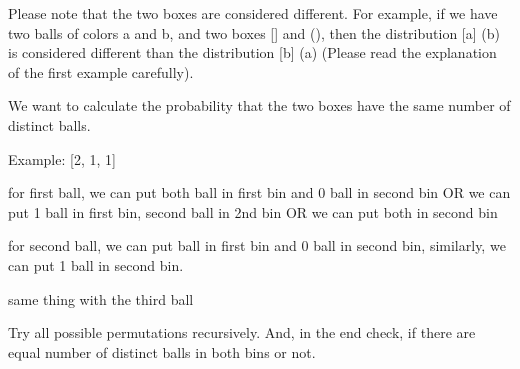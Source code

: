 \documentclass[9pt, b5paaper]{book}
\begin{document}
Please note that the two boxes are considered different. For example, if we have two balls of colors a and b, and two boxes [] and (), then the distribution [a] (b) is considered different than the distribution [b] (a) (Please read the explanation of the first example carefully).

We want to calculate the probability that the two boxes have the same number of distinct balls.

Example: [2, 1, 1]

for first ball, we can put both ball in first bin and 0 ball in second bin OR we can put 1 ball in first bin, second ball in 2nd bin OR we can put both in second bin

for second ball, we can put ball in first bin and 0 ball in second bin, similarly, we can put 1 ball in second bin.

same thing with the third ball

Try all possible permutations recursively. And, in the end check, if there are equal number of distinct balls in both bins or not.
\end{document}
